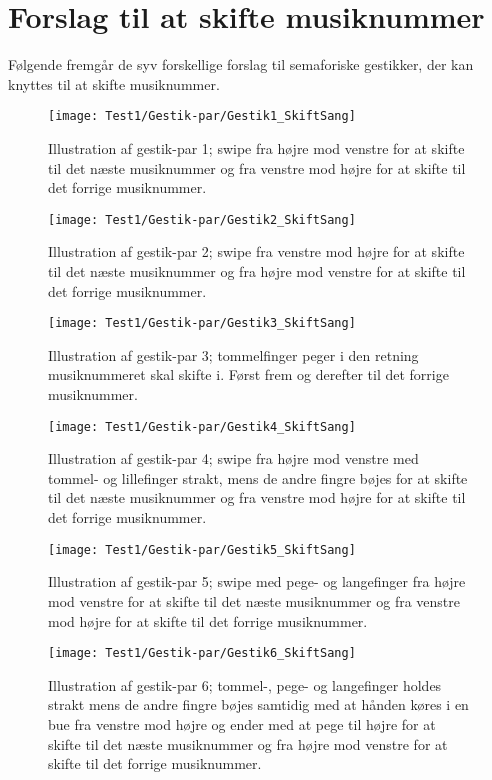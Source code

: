 \section{Forslag til at skifte musiknummer}
\label{app:ForslagSkift}
%
Følgende fremgår de syv forskellige forslag til semaforiske gestikker, der kan knyttes til at skifte musiknummer.
%
\begin{figure}[H]
	\centering
	\texttt{[image: Test1/Gestik-par/Gestik1\_SkiftSang]}
	\caption{Illustration af gestik-par 1; swipe fra højre mod venstre for at skifte til det næste musiknummer og fra venstre mod højre for at skifte til det forrige musiknummer.}
	\label{fig:GestikPar1SkiftApp}
\end{figure}
\noindent
%
%
\begin{figure}[H]
	\centering
	\texttt{[image: Test1/Gestik-par/Gestik2\_SkiftSang]}
	\caption{Illustration af gestik-par 2; swipe fra venstre mod højre for at skifte til det næste musiknummer og fra højre mod venstre for at skifte til det forrige musiknummer.}
	\label{fig:GestikPar2SkiftApp}
\end{figure}
\noindent
%
%
\begin{figure}[H]
	\centering
	\texttt{[image: Test1/Gestik-par/Gestik3\_SkiftSang]}
	\caption{Illustration af gestik-par 3; tommelfinger peger i den retning musiknummeret skal skifte i. Først frem og derefter til det forrige musiknummer.}
	\label{fig:GestikPar3SkiftApp}
\end{figure}
\noindent
%
%
\begin{figure}[H]
	\centering
	\texttt{[image: Test1/Gestik-par/Gestik4\_SkiftSang]}
	\caption{Illustration af gestik-par 4; swipe fra højre mod venstre med tommel- og lillefinger strakt, mens de andre fingre bøjes for at skifte til det næste musiknummer og fra venstre mod højre for at skifte til det forrige musiknummer.}
	\label{fig:GestikPar4SkiftApp}
\end{figure}
\noindent
%
%
\begin{figure}[H]
	\centering
	\texttt{[image: Test1/Gestik-par/Gestik5\_SkiftSang]}
	\caption{Illustration af gestik-par 5; swipe med pege- og langefinger fra højre mod venstre for at skifte til det næste musiknummer og fra venstre mod højre for at skifte til det forrige musiknummer.}
	\label{fig:GestikPar5SkiftApp}
\end{figure}
\noindent
%
%
\begin{figure}[H]
	\centering
	\texttt{[image: Test1/Gestik-par/Gestik6\_SkiftSang]}
	\caption{Illustration af gestik-par 6; tommel-, pege- og langefinger holdes strakt mens de andre fingre bøjes samtidig med at hånden køres i en bue fra venstre mod højre og ender med at pege til højre for at skifte til det næste musiknummer og fra højre mod venstre for at skifte til det forrige musiknummer.}
	\label{fig:GestikPar6SkiftApp}
\end{figure}
